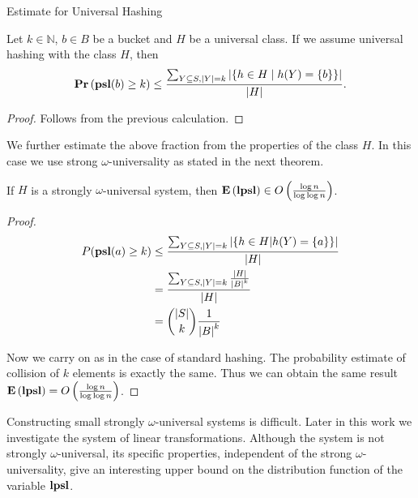 \begin{section}{Estimate for Universal Hashing}
\begin{claim}
Let $k \in \mathbb{N}$, $b \in B$ be a bucket and $H$ be a universal class. If we assume universal hashing with the class $H$, then
\[
	\mathbf{Pr}\left(\mathbf{psl}(b) \geq k\right) \leq \frac{\sum\displaylimits_{Y \subseteq S, |Y| = k} | \{ h \in H \mid h(Y) = \{ b \} \}|}{|H|} \text{.}
\]
\end{claim}
\begin{proof}
Follows from the previous calculation.
\end{proof}

We further estimate the above fraction from the properties of the class $H$. In this case we use strong $\omega$-universality as stated in the next theorem.

\begin{theorem}
If $H$ is a strongly $\omega$-universal system, then $\mathbf{E}\left(\mathbf{lpsl}\right) \in O\left(\frac{\log n}{\log \log n}\right)$.
\end{theorem}
\begin{proof}
\begin{displaymath}
\begin{split}
P(\mathbf{psl}(a) \geq k) 
	& \leq \frac{\sum\displaylimits_{Y \subseteq S, |Y| = k} | \{ h \in H | h(Y) = \{a\} \}|}{|H|} \\
	& = \frac{\sum\displaylimits_{Y \subseteq S, |Y| = k} \frac{|H|}{{|B|}^{k}}}{|H|} \\
	& = \dbinom{|S|}{k}\frac{1}{{|B|}^k}
\end{split}
\end{displaymath}

Now we carry on as in the case of standard hashing. The probability estimate of collision of $k$ elements is exactly the same. Thus we can obtain the same result $\mathbf{E}\left(\mathbf{lpsl}\right) = O\left(\frac{\log n}{\log \log n}\right)$.
\end{proof}

Constructing small strongly $\omega$-universal systems is difficult. Later in this work we investigate the system of linear transformations. Although the system is not strongly $\omega$-universal, its specific properties, independent of the strong $\omega$-universality, give an interesting upper bound on the distribution function of the variable $\mathbf{lpsl}$.
\end{section}
